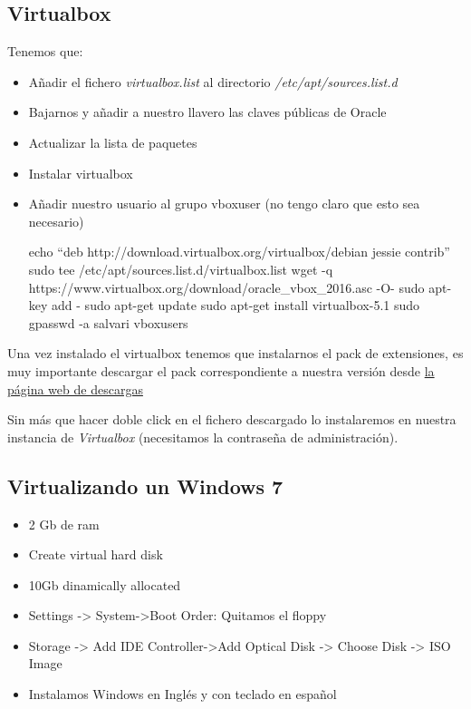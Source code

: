\documentclass[12pt,spanish,]{article}
\providecommand{\tightlist}{%
  \setlength{\itemsep}{0pt}\setlength{\parskip}{0pt}}
\begin{document}
\subsection{Virtualbox}\label{virtualbox}

Tenemos que:

\begin{itemize}
\item
  Añadir el fichero \emph{virtualbox.list} al directorio
  \emph{/etc/apt/sources.list.d}
\item
  Bajarnos y añadir a nuestro llavero las claves públicas de Oracle
\item
  Actualizar la lista de paquetes
\item
  Instalar virtualbox
\item
  Añadir nuestro usuario al grupo vboxuser (no tengo claro que esto sea
  necesario)

  echo ``deb http://download.virtualbox.org/virtualbox/debian jessie
  contrib'' \textbar{}sudo tee /etc/apt/sources.list.d/virtualbox.list
  wget -q https://www.virtualbox.org/download/oracle\_vbox\_2016.asc -O-
  \textbar{} sudo apt-key add - sudo apt-get update sudo apt-get install
  virtualbox-5.1 sudo gpasswd -a salvari vboxusers
\end{itemize}

Una vez instalado el virtualbox tenemos que instalarnos el pack de
extensiones, es muy importante descargar el pack correspondiente a
nuestra versión desde
\href{https://www.virtualbox.org/wiki/Downloads?}{la página web de
descargas}

Sin más que hacer doble click en el fichero descargado lo instalaremos
en nuestra instancia de \emph{Virtualbox} (necesitamos la contraseña de
administración).

\subsection{Virtualizando un Windows
7}\label{virtualizando-un-windows-7}

\begin{itemize}
\tightlist
\item
  2 Gb de ram
\item
  Create virtual hard disk
\item
  10Gb dinamically allocated
\item
  Settings -\textgreater{} System-\textgreater{}Boot Order: Quitamos el
  floppy
\item
  Storage -\textgreater{} Add IDE Controller-\textgreater{}Add Optical
  Disk -\textgreater{} Choose Disk -\textgreater{} ISO Image
\item
  Instalamos Windows en Inglés y con teclado en español
\end{itemize}
\end{document}
